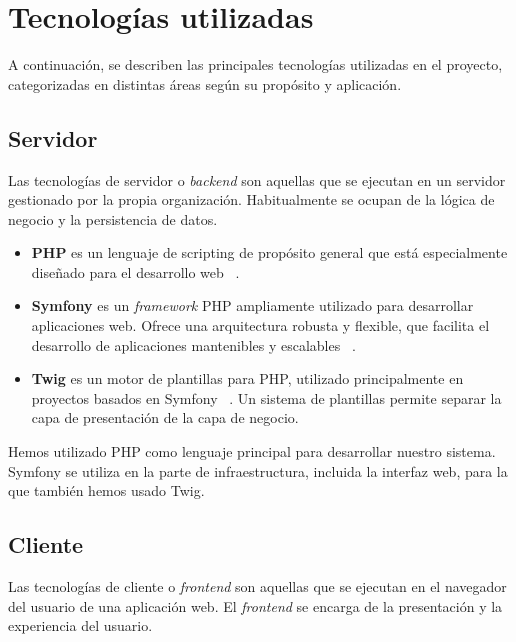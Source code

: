 \section{Tecnologías utilizadas}

A continuación, se describen las principales tecnologías utilizadas en el proyecto, categorizadas en distintas áreas
según su propósito y aplicación.

\subsection*{Servidor}

Las tecnologías de servidor o \textit{backend} son aquellas que se ejecutan en un servidor gestionado por la propia
organización.
Habitualmente se ocupan de la lógica de negocio y la persistencia de datos.

\begin{itemize}
    \item \textbf{PHP} es un lenguaje de scripting de propósito general que está especialmente diseñado para el
    desarrollo web ~\cite{https://www.php.net/}.
    \item \textbf{Symfony} es un \textit{framework} PHP ampliamente utilizado para desarrollar aplicaciones web.
    Ofrece una arquitectura robusta y flexible, que facilita el desarrollo de aplicaciones mantenibles y escalables
    ~\cite{https://symfony.com/}.
    \item \textbf{Twig} es un motor de plantillas para PHP, utilizado principalmente en proyectos basados en
    Symfony ~\cite{https://twig.symfony.com/}.
    Un sistema de plantillas permite separar la capa de presentación de la capa de negocio.
\end{itemize}

Hemos utilizado PHP como lenguaje principal para desarrollar nuestro sistema.
Symfony se utiliza en la parte de infraestructura, incluida la interfaz web, para la que también hemos usado Twig.

\subsection*{Cliente}

Las tecnologías de cliente o \textit{frontend} son aquellas que se ejecutan en el navegador del usuario de una
aplicación web.
El \textit{frontend} se encarga de la presentación y la experiencia del usuario.

